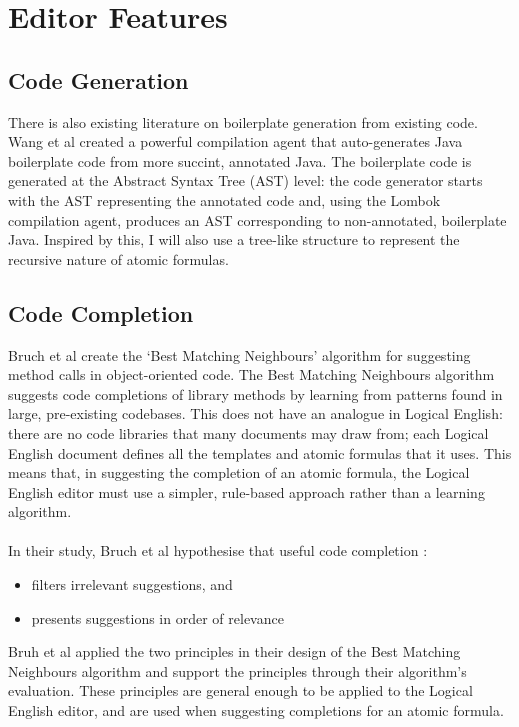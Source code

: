 \documentclass[../main.tex]{subfiles}
\begin{document}
\section{Editor Features}
\subsection{Code Generation}
There is also existing literature on boilerplate generation from existing code. Wang et al \cite[]{classless_java} created a powerful compilation agent that auto-generates Java boilerplate code from more succint, annotated Java. The boilerplate code is generated at the Abstract Syntax Tree (AST) level: the code generator starts with the AST representing the annotated code and, using the Lombok compilation agent, produces an AST corresponding to non-annotated, boilerplate Java. Inspired by this, I will also use a tree-like structure to represent the recursive nature of atomic formulas.

\subsection{Code Completion}
Bruch et al \cite{code_completion_study} create the `Best Matching Neighbours' algorithm for suggesting method calls in object-oriented code. The Best Matching Neighbours algorithm suggests code completions of library methods by learning from patterns found in large, pre-existing codebases. This does not have an analogue in Logical English: there are no code libraries that many documents may draw from; each Logical English document defines all the templates and atomic formulas that it uses. This means that, in suggesting the completion of an atomic formula, the Logical English editor must use a simpler, rule-based approach rather than a learning algorithm.
\\
\\
In their study, Bruch et al hypothesise that useful code completion \cite[p.~214]{code_completion_study}:
\begin{itemize}
    \item filters irrelevant suggestions, and
    \item presents suggestions in order of relevance
\end{itemize}
Bruh et al applied the two principles in their design of the Best Matching Neighbours algorithm and support the principles through their algorithm's evaluation. These principles are general enough to be applied to the Logical English editor, and are used when suggesting completions for an atomic formula.
\end{document}

